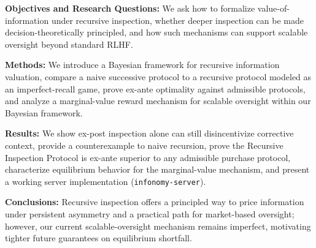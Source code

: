 
\noindent\textbf{Objectives and Research Questions:} We ask how to formalize value-of-information under recursive inspection, whether deeper inspection can be made decision-theoretically principled, and how such mechanisms can support scalable oversight beyond standard RLHF.

 \noindent\textbf{Methods:} We introduce a Bayesian framework for recursive information valuation, compare a naive successive protocol to a recursive protocol modeled as an imperfect-recall game, prove ex-ante optimality against admissible protocols, and analyze a marginal-value reward mechanism for scalable oversight within our Bayesian framework.

\noindent\textbf{Results:} We show ex-post inspection alone can still disincentivize corrective context, provide a counterexample to naive recursion, prove the Recursive Inspection Protocol is ex-ante superior to any admissible purchase protocol, characterize equilibrium behavior for the marginal-value mechanism, and present a working server implementation (\texttt{infonomy-server}).

\noindent\textbf{Conclusions:} Recursive inspection offers a principled way to price information under persistent asymmetry and a practical path for market-based oversight; however, our current scalable-oversight mechanism remains imperfect, motivating tighter future guarantees on equilibrium shortfall.



